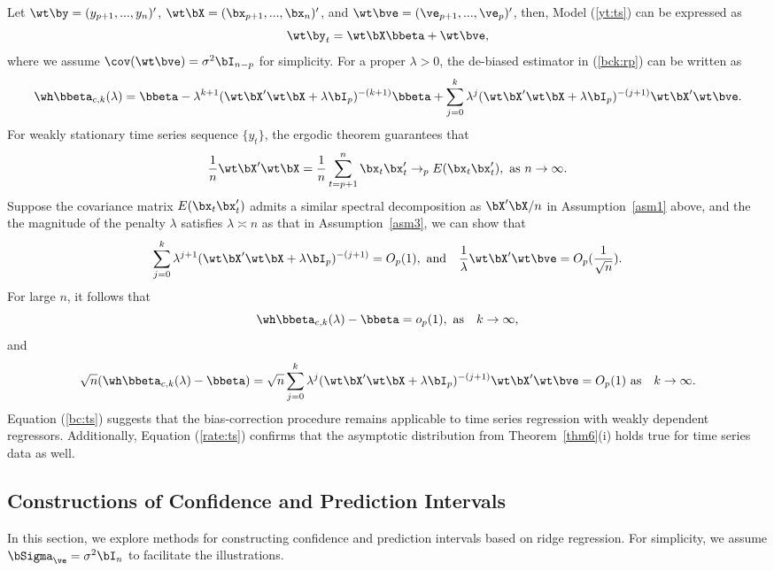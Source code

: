 Let $\wt\by=(y_{p+1},...,y_n)'$, $\wt\bX=(\bx_{p+1},...,\bx_{n})'$, and $\wt\bve=(\ve_{p+1},...,\ve_{p})'$, then, Model (\ref{yt:ts}) can be expressed as
\begin{equation}
    \wt\by_t=\wt\bX\bbeta+\wt\bve,
\end{equation}
where we assume $\cov(\wt\bve)=\sigma^2\bI_{n-p}$ for simplicity. For a proper $\lambda>0$, the de-biased estimator in (\ref{bck:rp}) can be written as
\[\wh\bbeta_{c,k}(\lambda)
   =\bbeta-\lambda^{k+1}(\wt\bX'\wt\bX+\lambda\bI_p)^{-(k+1)}\bbeta+\sum_{j=0}^k\lambda^j(\wt\bX'\wt\bX+\lambda\bI_p)^{-(j+1)}\wt\bX'\wt\bve.\]
For weakly stationary time series sequence $\{y_t\}$, the ergodic theorem guarantees that
\[\frac{1}{n}\wt\bX'\wt\bX=\frac{1}{n}\sum_{t=p+1}^n\bx_t\bx_{t}'\rightarrow_p E(\bx_t\bx_t'),\,\,\text{as}\,\, n\rightarrow\infty.\]
Suppose the covariance matrix $E(\bx_t\bx_t')$ admits a similar spectral decomposition as $\bX'\bX/n$ in Assumption~\ref{asm1} above, and  the the magnitude of the penalty $\lambda$ satisfies $\lambda\asymp n$ as that in Assumption~\ref{asm3}, we can show that
\[\sum_{j=0}^k\lambda^{j+1}(\wt\bX'\wt\bX+\lambda\bI_p)^{-(j+1)}=O_p(1),\,\,\text{and}\quad\frac{1}{\lambda}\wt\bX'\wt\bve=O_p(\frac{1}{\sqrt{n}}).\]
For large $n$, it follows that
\begin{equation}\label{bc:ts}
    \wh\bbeta_{c,k}(\lambda)-\bbeta=o_p(1),\,\,\text{as}\quad k\rightarrow\infty,
\end{equation}
and 
\begin{equation}\label{rate:ts}
    \sqrt{n}(\wh\bbeta_{c,k}(\lambda)-\bbeta)=\sqrt{n}\sum_{j=0}^k\lambda^j(\wt\bX'\wt\bX+\lambda\bI_p)^{-(j+1)}\wt\bX'\wt\bve=O_p(1)\,\,\text{as}\quad k\rightarrow\infty.
\end{equation}
Equation (\ref{bc:ts}) suggests that the bias-correction procedure remains applicable to time series regression with weakly dependent regressors. Additionally, Equation (\ref{rate:ts}) confirms that the asymptotic distribution from Theorem~\ref{thm6}(i) holds true for time series data as well.

\subsection{Constructions of Confidence and Prediction Intervals}\label{sec27}
In this section, we explore methods for constructing confidence and prediction intervals based on ridge regression. For simplicity, we assume  $\bSigma_\ve=\sigma^2\bI_n$ to facilitate the illustrations.

